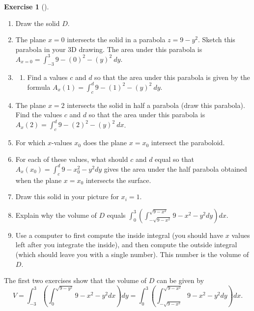 \documentclass[10pt,]{book}
\theoremstyle{plain}
\theoremstyle{definition}
\theoremstyle{definition}
\theoremstyle{definition}
\theoremstyle{definition}
\newtheorem{exploration}[project]{Exercise}
\theoremstyle{definition}
\numberwithin{equation}{section}
\newcommand{\ds}{\displaystyle}
\begin{document}
\begin{exploration}[]\label{exploration-249}
\leavevmode%
\begin{enumerate}[font=\bfseries,label=(\alph*),ref=\alph*]
\item\label{task-671} Draw the solid \(D\).%
\item\label{task-672} The plane \(x=0\) intersects the solid in a parabola \(z=9-y^2\). Sketch this parabola in your 3D drawing. The area under this parabola is \(A_{x=0} = \int_{-3}^3 9-(0)^2-(y)^2 \ dy\).%
\item\label{task-673} \begin{enumerate}[font=\bfseries,label=(\roman*),ref=\theenumi.\roman*]
\item\label{task-674} Find a values \(c\) and \(d\) so that the area under this parabola is given by the formula \(A_x(1)=\int_c^{d} 9-(1)^2-(y)^2 \ dy\).%
\end{enumerate}
\item\label{task-675} The plane \(x=2\) intersects the solid in half a parabola (draw this parabola). Find the values \(c\) and \(d\) so that the area under this parabola is \(A_x(2)=\int_c^d 9-(2)^2-(y)^2 \ dx\).%
\item\label{task-676} For which \(x\)-values \(x_0\) does the plane \(x=x_0\) intersect the paraboloid.%
\item\label{task-677} For each of these values, what should \(c\) and \(d\) equal so that \(A_x(x_0) = \int_c^d 9-x_0^2-y^2 dy\) gives the area under the half parabola obtained when the plane \(x=x_0\) intersects the surface.%
\item\label{task-678} Draw this solid in your picture for \(x_i = 1\).%
\item\label{task-679} Explain why the volume of \(D\) equals \(\ds\int_{0}^{3} \left(\int_{-\sqrt{9-x^2}}^{\sqrt{9-x^2}}9-x^2-y^2 dy\right) dx\).%
\item\label{task-680} Use a computer to first compute the inside integral (you should have \(x\) values left after you integrate the inside), and then compute the outside integral (which should leave you with a single number). This number is the volume of \(D\).%
\end{enumerate}
\end{exploration}
The first two exercises show that the volume of \(D\) can be given by%
\begin{equation*}
V=\ds\int_{-3}^{3} \left(\int_0^{\sqrt{9-y^2}}9-x^2-y^2 dx\right) dy = \ds\int_{0}^{3} \left(\int_{-\sqrt{9-x^2}}^{\sqrt{9-x^2}}9-x^2-y^2 dy\right) dx.
\end{equation*}
\end{document}
